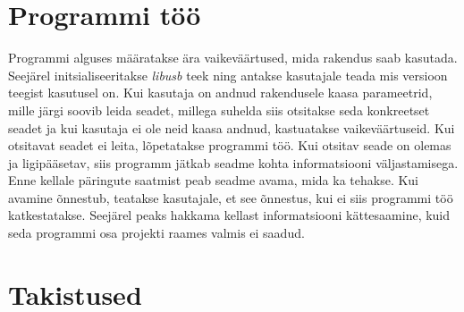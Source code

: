 \section{Programmi töö}\label{sec:programmi-too}
Programmi alguses määratakse ära vaikeväärtused, mida rakendus saab kasutada.
Seejärel initsialiseeritakse \textit{libusb} teek ning antakse kasutajale teada mis versioon teegist kasutusel on.
Kui kasutaja on andnud rakendusele kaasa parameetrid, mille järgi soovib leida seadet, millega suhelda siis otsitakse seda konkreetset seadet ja kui kasutaja ei ole neid kaasa andnud, kastuatakse vaikeväärtuseid.
Kui otsitavat seadet ei leita, lõpetatakse programmi töö.
Kui otsitav seade on olemas ja ligipääsetav, siis programm jätkab seadme kohta informatsiooni väljastamisega.
Enne kellale päringute saatmist peab seadme avama, mida ka tehakse.
Kui avamine õnnestub, teatakse kasutajale, et see õnnestus, kui ei siis programmi töö katkestatakse.
Seejärel peaks hakkama kellast informatsiooni kättesaamine, kuid seda programmi osa projekti raames valmis ei saadud.

\section{Takistused}
